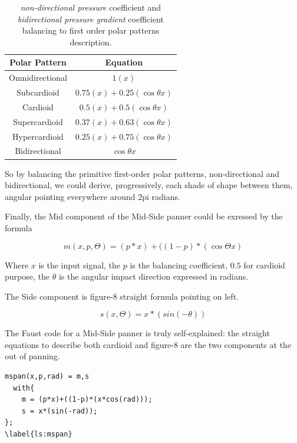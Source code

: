 \documentclass{article}
\begin{document}
\begin{table}[h]
 \begin{center}
 \begin{tabular}{cc}
  Polar Pattern & Equation \\
  \hline
  Omnidirectional & $ 1(x) $ \\
  Subcardioid     & $ 0.75(x) + 0.25(\cos\theta x) $ \\
  Cardioid        & $ 0.5(x) + 0.5(\cos\theta x) $ \\
  Supercardioid   & $ 0.37(x) + 0.63(\cos\theta x) $ \\
  Hypercardioid   & $ 0.25(x) + 0.75(\cos\theta x) $ \\
  Bidirectional   & $ \cos\theta x $ \\
 \end{tabular}
\end{center}
 \caption{\emph{non-directional pressure} coefficient and \emph{bidirectional pressure gradient} coefficient balancing to first order polar patterns description.}
 \label{tab:example}
\end{table}

So by balancing the primitive first-order polar patterns, non-directional and bidirectional, we could derive, progressively, each shade of shape between them, angular pointing everywhere around 2pi radians.

Finally, the Mid component of the Mid-Side panner could be exressed by the formula

\begin{equation}
m(x,p,\Theta) = (p*x) + ((1-p)*(\cos\Theta x)
\label{eq:mid}
\end{equation}

Where $x$ is the input signal, the $p$ is the balancing coefficient, $0.5$ for cardioid purpose, the $\theta$ is the angular impact direction expressed in radians.

The Side component is figure-8 straight formula pointing on left.

\begin{equation}
s(x,\Theta) = x*(sin(-\theta))
\label{eq:mid}
\end{equation}

The Faust code for a Mid-Side panner is truly self-explained: the straight equations to describe both cardioid and figure-8 are the two components at the out of panning.
\begin{lstlisting}
mspan(x,p,rad) = m,s
  with{
    m = (p*x)+((1-p)*(x*cos(rad)));
    s = x*(sin(-rad));
};
\label{ls:mspan}
\end{lstlisting}
\end{document}
